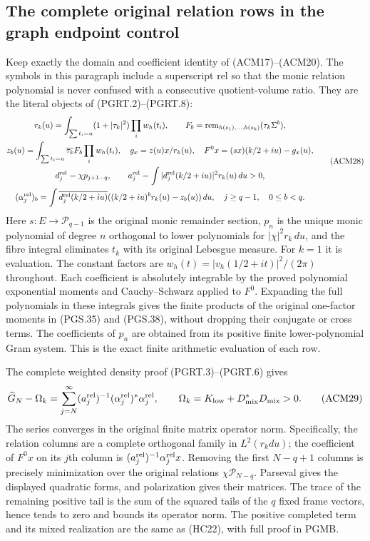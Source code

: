 \subsection{The complete original relation rows in the graph endpoint control}

Keep exactly the domain and coefficient identity of (ACM17)--(ACM20).
The symbols in this paragraph include a superscript $\mathrm{rel}$
so that the monic relation polynomial is never confused with a
consecutive quotient-volume ratio. They are the literal objects of
(PGRT.2)--(PGRT.8):
\[
\begin{gathered}
 r_k(u)=\int_{\sum t_i=u}(1+|\tau_k|^2)\prod_iw_h(t_i),\qquad
 F_b=\operatorname{rem}_{h(s_1),\ldots,h(s_k)}(\tau_k\Sigma^b),\\
 z_b(u)=\int_{\sum t_i=u}\overline{\tau_k}F_b\prod_iw_h(t_i),
 \quad g_x=z(u)x/r_k(u),\quad
 F^0x=(sx)(k/2+iu)-g_x(u),\\
 d_j^{\rm rel}=\chi p_{j+1-q},\qquad
 a_j^{\rm rel}=\int|d_j^{\rm rel}(k/2+iu)|^2r_k(u)\,du>0,\\
 (\alpha_j^{\rm rel})_b=
 \int\overline{d_j^{\rm rel}(k/2+iu)}
       ((k/2+iu)^b r_k(u)-z_b(u))\,du,
 \quad j\geq q-1,\quad 0\leq b<q.
\end{gathered}\tag{ACM28}
\]
Here $s:E\to\mathcal P_{q-1}$ is the original monic remainder
section, $p_n$ is the unique monic polynomial of degree $n$
orthogonal to lower polynomials for $|\chi|^2r_k\,du$, and the
fibre integral eliminates $t_k$ with its original Lebesgue measure.
For $k=1$ it is evaluation. The constant factors are
$w_h(t)=|v_h(1/2+it)|^2/(2\pi)$ throughout. Each coefficient is
absolutely integrable by the proved polynomial exponential moments
and Cauchy--Schwarz applied to $F^0$. Expanding the full polynomials
in these integrals gives the finite products of the original
one-factor moments in (PGS.35) and (PGS.38), without dropping their
conjugate or cross terms. The coefficients of $p_n$ are obtained
from its positive finite lower-polynomial Gram system. This is
the exact finite arithmetic evaluation of each row.

The complete weighted density proof (PGRT.3)--(PGRT.6) gives
\[
 \widehat G_N-\Omega_k
  =\sum_{j=N}^{\infty}
       (a_j^{\rm rel})^{-1}(\alpha_j^{\rm rel})^*
                                  \alpha_j^{\rm rel},
 \qquad \Omega_k=K_{\rm low}+D_{\rm mix}^*D_{\rm mix}>0.
 \tag{ACM29}
\]
The series converges in the original finite matrix operator norm.
Specifically, the relation columns are a complete orthogonal family
in $L^2(r_kdu)$; the coefficient of $F^0x$ on its $j$th column is
$(a_j^{\rm rel})^{-1}\alpha_j^{\rm rel}x$. Removing the first
$N-q+1$ columns is precisely minimization over the original
relations $\chi\mathcal P_{N-q}$. Parseval gives the displayed
quadratic forms, and polarization gives their matrices. The trace
of the remaining positive tail is the sum of the squared tails
of the $q$ fixed frame vectors, hence tends to zero and bounds
its operator norm. The positive completed term and its mixed
realization are the same as (HC22), with full proof in PGMB.

